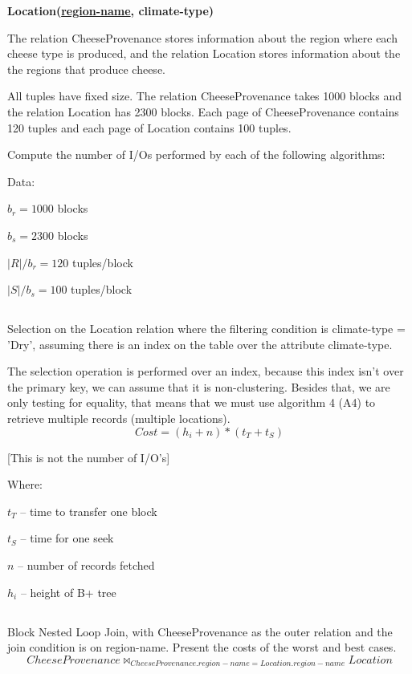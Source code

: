 \documentclass[11pt,report]{article}
\newcommand{\tab}{\hspace*{3em}}
\begin{document}
	\textbf{\color{gray}\tab Location(\underline{region-name}, climate-type)}

{\color{gray}The relation CheeseProvenance stores information about the region where each cheese type is produced, and the relation Location stores information about the the regions that produce cheese.}

{\color{gray}All tuples have fixed size. The relation CheeseProvenance takes 1000 blocks and the relation Location has 2300 blocks. Each page of CheeseProvenance contains 120 tuples and each page of Location contains 100 tuples.}

{\color{gray} Compute the number of I/Os performed by each of the following algorithms:}

	Data:

	\tab $b_r = 1000$ blocks

	\tab $b_s = 2300$ blocks

	\tab $|R|/b_r = 120$ tuples/block

	\tab $|S|/b_s = 100$ tuples/block


	\subsection{}
	{\color{gray} Selection on the Location relation where the filtering condition is climate-type = 'Dry', assuming there is an index on the table over the attribute climate-type.}

	The selection operation is performed over an index, because this index isn't over the primary key, we can assume that it is non-clustering. Besides that, we are only testing for equality, that means that we must use algorithm 4 (A4) to retrieve multiple records (multiple locations).
	\begin{equation}Cost = (h_i + n) * (t_T + t_S)\end{equation}
	
	{\color{red} [This is not the number of I/O's]}

	Where:

	\tab $t_T$ – time to transfer one block

	\tab $t_S$ – time for one seek

	\tab $n$ – number of records fetched

	\tab $h_i$ – height of B+ tree

	\subsection{}
	{\color{gray} Block Nested Loop Join, with CheeseProvenance as the outer relation and the join condition is on region-name. Present the costs of the worst and best cases.}
	\begin{equation}CheeseProvenance \bowtie_{CheeseProvenance.region-name=Location.region-name} Location\end{equation}
\end{document}
